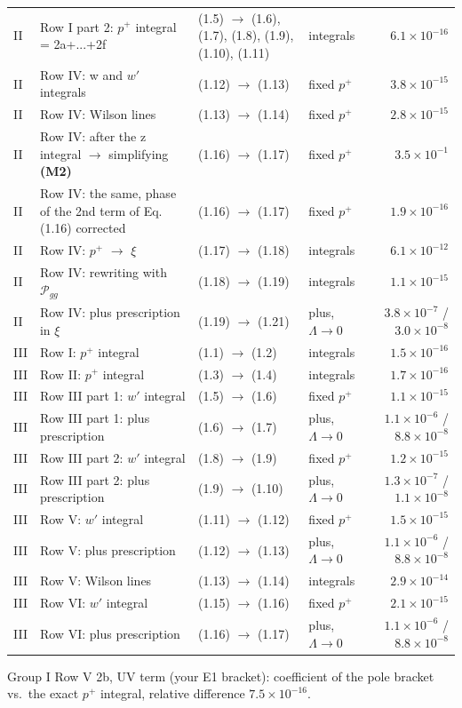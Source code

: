 \documentclass[10pt]{article}
\numberwithin{equation}{section}
\begin{document}
{\begin{longtable}{@{}lp{}p{}lr@{}}
II & Row I part 2: $p^+$ integral = 2a+...+2f & (1.5) $\to$ (1.6), (1.7), (1.8), (1.9), (1.10), (1.11) & integrals & $6.1\times10^{-16}$\\
II & Row IV: w and $w'$ integrals & (1.12) $\to$ (1.13) & fixed $p^+$ & $3.8\times10^{-15}$\\
II & Row IV: Wilson lines & (1.13) $\to$ (1.14) & fixed $p^+$ & $2.8\times10^{-15}$\\
II & Row IV: after the z integral $\to$ simplifying \textbf{(M2)} & (1.16) $\to$ (1.17) & fixed $p^+$ & $3.5\times10^{-1}$\\
II & Row IV: the same, phase of the 2nd term of Eq. (1.16) corrected & (1.16) $\to$ (1.17) & fixed $p^+$ & $1.9\times10^{-16}$\\
II & Row IV: $p^+$ $\to$ $\xi$ & (1.17) $\to$ (1.18) & integrals & $6.1\times10^{-12}$\\
II & Row IV: rewriting with $\mathcal P_{gg}$ & (1.18) $\to$ (1.19) & integrals & $1.1\times10^{-15}$\\
II & Row IV: plus prescription in $\xi$ & (1.19) $\to$ (1.21) & plus, $\Lambda\to0$ & $3.8\times10^{-7}$ / $3.0\times10^{-8}$\\
III & Row I: $p^+$ integral & (1.1) $\to$ (1.2) & integrals & $1.5\times10^{-16}$\\
III & Row II: $p^+$ integral & (1.3) $\to$ (1.4) & integrals & $1.7\times10^{-16}$\\
III & Row III part 1: $w'$ integral & (1.5) $\to$ (1.6) & fixed $p^+$ & $1.1\times10^{-15}$\\
III & Row III part 1: plus prescription & (1.6) $\to$ (1.7) & plus, $\Lambda\to0$ & $1.1\times10^{-6}$ / $8.8\times10^{-8}$\\
III & Row III part 2: $w'$ integral & (1.8) $\to$ (1.9) & fixed $p^+$ & $1.2\times10^{-15}$\\
III & Row III part 2: plus prescription & (1.9) $\to$ (1.10) & plus, $\Lambda\to0$ & $1.3\times10^{-7}$ / $1.1\times10^{-8}$\\
III & Row V: $w'$ integral & (1.11) $\to$ (1.12) & fixed $p^+$ & $1.5\times10^{-15}$\\
III & Row V: plus prescription & (1.12) $\to$ (1.13) & plus, $\Lambda\to0$ & $1.1\times10^{-6}$ / $8.8\times10^{-8}$\\
III & Row V: Wilson lines & (1.13) $\to$ (1.14) & integrals & $2.9\times10^{-14}$\\
III & Row VI: $w'$ integral & (1.15) $\to$ (1.16) & fixed $p^+$ & $2.1\times10^{-15}$\\
III & Row VI: plus prescription & (1.16) $\to$ (1.17) & plus, $\Lambda\to0$ & $1.1\times10^{-6}$ / $8.8\times10^{-8}$\\
\bottomrule
\end{longtable}}
\noindent Group I Row V 2b, UV term (your E1 bracket): coefficient of the pole bracket vs.\ the exact $p^+$ integral, relative difference $7.5\times10^{-16}$.
\end{document}
